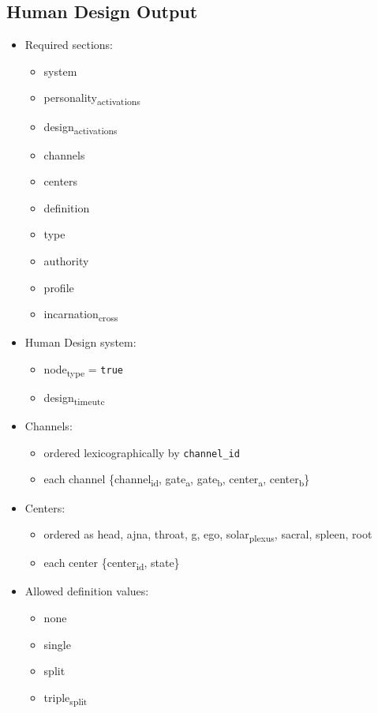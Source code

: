 \documentclass[11pt]{article}
\begin{document}
\subsection{Human Design Output}
\label{sec:org0dbd91b}
\begin{itemize}
\item Required sections:
\begin{itemize}
\item system
\item personality\textsubscript{activations}
\item design\textsubscript{activations}
\item channels
\item centers
\item definition
\item type
\item authority
\item profile
\item incarnation\textsubscript{cross}
\end{itemize}
\item Human Design system:
\begin{itemize}
\item node\textsubscript{type} = \texttt{true}
\item design\textsubscript{time}\textsubscript{utc}
\end{itemize}
\item Channels:
\begin{itemize}
\item ordered lexicographically by \texttt{channel\_id}
\item each channel \{channel\textsubscript{id}, gate\textsubscript{a}, gate\textsubscript{b}, center\textsubscript{a}, center\textsubscript{b}\}
\end{itemize}
\item Centers:
\begin{itemize}
\item ordered as head, ajna, throat, g, ego, solar\textsubscript{plexus}, sacral, spleen, root
\item each center \{center\textsubscript{id}, state\}
\end{itemize}
\item Allowed definition values:
\begin{itemize}
\item none
\item single
\item split
\item triple\textsubscript{split}

\end{itemize}
\end{itemize}
\end{document}

